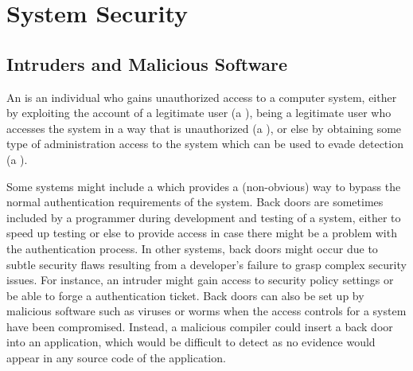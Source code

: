 
\chapter{System Security}


\section{Intruders and Malicious Software}
An  is an individual who gains unauthorized access to a computer system,
either by exploiting the account of a legitimate user (a ), being
a legitimate user who accesses the system in a way that is unauthorized
(a ), or else by obtaining some type of administration access to the
system which can be used to evade detection (a ).

Some systems might include a  which provides a (non-obvious) way to bypass
the normal authentication requirements of the system.
Back doors are sometimes included by a programmer during development and testing of a system,
either to speed up testing or else to provide access in case there might be a problem with
the authentication process.
In other systems, back doors might occur due to subtle security flaws resulting from
a developer's failure to grasp complex security issues.
For instance, an intruder might gain access to security policy settings or
be able to forge a authentication ticket.
Back doors can also be set up by malicious software such as viruses or worms
when the access controls for a system have been compromised.
Instead, a malicious compiler could insert a back door into an application, which would be
difficult to detect as no evidence would appear in any source code of the application.

